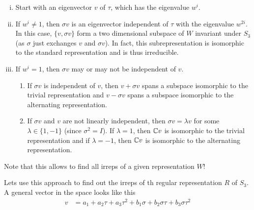\begin{enumerate}[(i)]
    \item Start with an eigenvector $v$ of $\tau$, which has the eigenvalue $w^i$.
    \item If $w^i\neq 1$, then $\sigma v$ is an eigenvector independent of $\tau$ with the eigenvalue $w^{2i}$. In this case, $\{v,\sigma v\}$ form a two dimensional subspace of $W$ invariant under $S_3$ (as $\sigma$ just exchanges $v$ and $\sigma v$). In fact, this subrepresentation is isomorphic to the standard representation and is thus irreducible.
    \item If $w^i = 1$, then $\sigma v$ may or may not be independent of $v$.
        \begin{enumerate}
            \item If $\sigma v$ is independent of $v$, then $v + \sigma v$ spans a subspace isomorphic to the trivial representation and $v - \sigma v$ spans a subspace isomorphic to the alternating representation. 
            \item If $\sigma v$ and $v$ are not linearly independent, then 
                $\sigma v= \lambda v$ for some $\lambda\in \{1,-1\}$ (since $\sigma^2=I$). If $\lambda=1$, then $\mathbb{C} v$ is isomorphic to the trivial representation and if $\lambda=-1$, then $\mathbb{C} v$ is isomorphic to the alternating representation.
        \end{enumerate}
\end{enumerate}

Note that this allows to find all irreps of a given representation $W$!

 Lets use this approach to find out the irreps of th regular representation $R$ of $S_3$. A general vector in the space looks like this
\begin{align}
    v &= a_1 + a_2 \tau + a_3 \tau^2 + b_1\sigma + b_2 \sigma\tau + b_3\sigma \tau^2 
\end{align}


